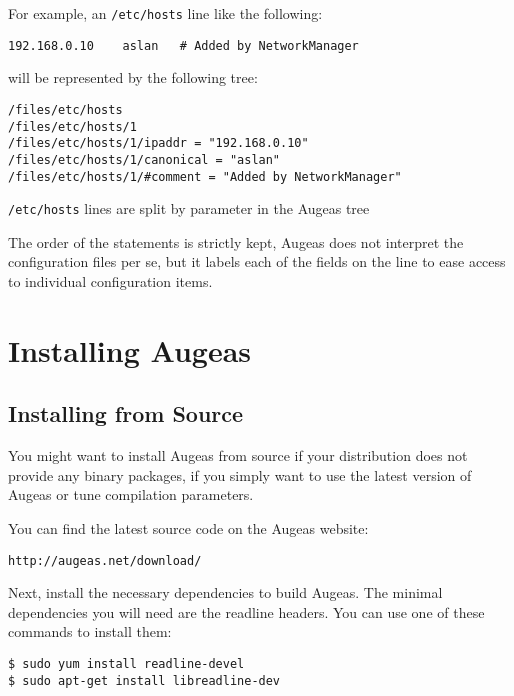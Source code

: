 For example, an \verb!/etc/hosts! line like the following:

\begin{verbatim}
192.168.0.10    aslan   # Added by NetworkManager
\end{verbatim}

will be represented by the following tree:

\begin{listing}
  \begin{verbatim}
/files/etc/hosts
/files/etc/hosts/1
/files/etc/hosts/1/ipaddr = "192.168.0.10"
/files/etc/hosts/1/canonical = "aslan"
/files/etc/hosts/1/#comment = "Added by NetworkManager"
  \end{verbatim}
  \caption{\texttt{/etc/hosts} lines are split by parameter in the Augeas tree}
  \label{lst:intro_hosts_tree}
\end{listing}

The order of the statements is strictly kept, Augeas does not interpret the configuration files per se, but it labels each of the fields on the line to ease access to individual configuration items.

\section{Installing Augeas}

\label{sec:installing_augeas} 

\subsection{Installing from Source}


You might want to install Augeas from source if your distribution does not provide any binary packages, if you simply want to use the latest version of Augeas or tune compilation parameters.

You can find the latest source code on the Augeas website:

\begin{verbatim}
http://augeas.net/download/
\end{verbatim}

Next, install the necessary dependencies to build Augeas. The minimal dependencies you will need are the readline headers. You can use one of these commands to install them:

\begin{verbatim}
$ sudo yum install readline-devel
$ sudo apt-get install libreadline-dev
\end{verbatim}

